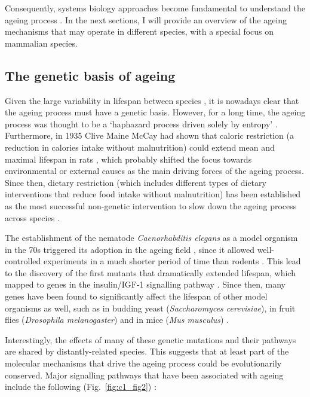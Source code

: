 Consequently, systems biology approaches become fundamental to understand the ageing process \cite{Freund2019}. In the next sections, I will provide an overview of the ageing mechanisms that may operate in different species, with a special focus on mammalian species. 

\smallskip

\subsection{The genetic basis of ageing} \label{s:1.1.2}

\smallskip

Given the large variability in lifespan between species \cite{Jones2013}, it is nowadays clear that the ageing process must have a genetic basis. However, for a long time, the ageing process was thought to be a `haphazard process driven solely by entropy' \cite{Kenyon2005}. Furthermore, in 1935 Clive Maine McCay had shown that caloric restriction (a reduction in calories intake without malnutrition) could extend mean and maximal lifespan in rats \cite{McCay1935,McDonald2010}, which probably shifted the focus towards environmental or external causes as the main driving forces of the ageing process. Since then, dietary restriction (which includes different types of dietary interventions that reduce food intake without malnutrition) has been established as the most successful non-genetic intervention to slow down the ageing process across species \cite{Fontana2015}.

\bigskip

The establishment of the nematode \textit{Caenorhabditis elegans} as a model organism in the 70s triggered its adoption in the ageing field \cite{KLASS1976}, since it allowed well-controlled experiments in a much shorter period of time than rodents \cite{Johnson2013}. This lead to the discovery of the first mutants that dramatically extended lifespan, which mapped to genes in the insulin/IGF-1 signalling pathway \cite{Kenyon1993,Morris1996}. Since then, many genes have been found to significantly affect the lifespan of other model organisms as well, such as in budding yeast (\textit{Saccharomyces cerevisiae}), in fruit flies (\textit{Drosophila melanogaster}) and in mice (\textit{Mus musculus}) \cite{Kenyon2005,Kenyon2010,Singh2019}. 

\bigskip

Interestingly, the effects of many of these genetic mutations and their pathways are shared by distantly-related species. This suggests that at least part of the molecular mechanisms that drive the ageing process could be evolutionarily conserved. Major signalling pathways that have been associated with ageing include the following (Fig.~\ref{fig:c1_fig2}) \cite{Kenyon2005,Kenyon2010,Singh2019,Greer2008}:

